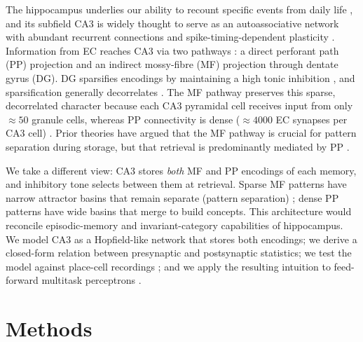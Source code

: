 \documentclass[11pt]{article}
\begin{document}
The hippocampus underlies our ability to recount specific events from daily life \cite{scoville1957}, and its subfield CA3 is widely thought to serve as an autoassociative network \cite{mcnaughton1987,oreilly2001,rolls2006} with abundant recurrent connections and spike-timing-dependent plasticity \cite{bipoo1998,mishra2016}. Information from EC reaches CA3 via two pathways \cite{amaral2006,amaral1990}: a direct perforant path (PP) projection and an indirect mossy-fibre (MF) projection through dentate gyrus (DG). DG sparsifies encodings by maintaining a high tonic inhibition \cite{engin2015}, and sparsification generally decorrelates \cite{marr1971,oreilly1994,vinje2000,pitkow2012,caycogajic2017}. The MF pathway preserves this sparse, decorrelated character because each CA3 pyramidal cell receives input from only $\approx 50$ granule cells, whereas PP connectivity is dense ($\approx 4000$ EC synapses per CA3 cell) \cite{amaral1990}. Prior theories have argued that the MF pathway is crucial for pattern separation during storage, but that retrieval is predominantly mediated by PP \cite{treves1992,mcclelland1996,kaifosh2016}.

We take a different view: CA3 stores \emph{both} MF and PP encodings of each memory, and inhibitory tone selects between them at retrieval. Sparse MF patterns have narrow attractor basins that remain separate (pattern separation) \cite{leutgeb2007,tsodyks1988}; dense PP patterns have wide basins that merge to build concepts. This architecture would reconcile episodic-memory \cite{scoville1957} and invariant-category \cite{quiroga2005} capabilities of hippocampus. We model CA3 as a Hopfield-like network \cite{hopfield1982,amit1985} that stores both encodings; we derive a closed-form relation between presynaptic and postsynaptic statistics; we test the model against place-cell recordings \cite{mizuseki2013crcns,karlsson2015}; and we apply the resulting intuition to feed-forward multitask perceptrons \cite{lecun2015deeplearning}.

\section{Methods}
\end{document}
